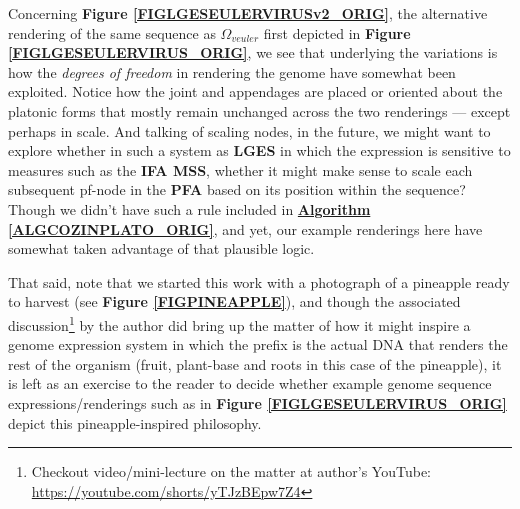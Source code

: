 \documentclass[a4paper, 18pt]{book} %
\newcommand{\comment}[1]{}
\begin{document}
\begin{appendices}
Concerning \textbf{Figure \ref{FIGLGESEULERVIRUSv2_ORIG}}, the alternative rendering  of the same sequence as $\Omega_{veuler}$ first depicted in \textbf{Figure \ref{FIGLGESEULERVIRUS_ORIG}}, we see that underlying the variations is how the \textit{degrees of freedom} in rendering the genome have somewhat been exploited. Notice how the joint and appendages are placed or oriented about the platonic forms that mostly remain unchanged across the two renderings --- except perhaps in scale. And talking of scaling nodes, in the future, we might want to explore whether in such a system as \textbf{LGES} in which the expression is sensitive to measures such as the \textbf{IFA MSS}, whether it might make sense to scale each subsequent pf-node in the \textbf{PFA} based on its position within the sequence? Though we didn't have such a rule included in \textbf{\hyperref[ALGCOZINPLATO_ORIG]{Algorithm \ref{ALGCOZINPLATO_ORIG}}}, and yet, our example renderings here have somewhat taken advantage of that plausible logic.

That said, note that we started this work with a photograph of a pineapple ready to harvest (see \textbf{Figure \ref{FIGPINEAPPLE}}), and though the associated discussion\footnote{Checkout video/mini-lecture on the matter at author's YouTube: \url{https://youtube.com/shorts/yTJzBEpw7Z4}} by the author did bring up the matter of how it might inspire a genome expression system in which the prefix is the actual DNA that renders the rest of the organism (fruit, plant-base and roots in this case of the pineapple), it is left as an exercise to the reader to decide whether example genome sequence expressions/renderings such as in \textbf{Figure \ref{FIGLGESEULERVIRUS_ORIG}} depict this pineapple-inspired philosophy.








\end{appendices}






\comment{


\vspace{5cm}
\fbox{
\begin{minipage}{0.9\textwidth}
\textbf{TO CITE:}\\

Lutalo, Joseph Willrich (2025). \textbf{The Theory of Sequence Transformers \& their Statistics:} \textit{The 3 Information Sequence Transformer Families (Anagrammatizers, Protractors, Compressors) and 4 New and Relevant Statistical Measures Applicable to Them: Anagram Distance, Modal Sequence Statistic, Transformation Compression Ratio and Piecemeal Compression Ratio.} figshare. Online Resource. \url{https://doi.org/10.6084/m9.figshare.29505824.v3}

\end{minipage}}
\\
}
\end{document}
